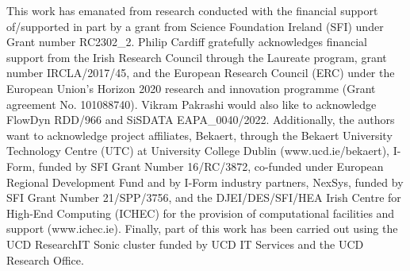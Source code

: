 \documentclass[sn-mathphys,Numbered]{sn-jnl}%
\begin{document}
This work has emanated from research conducted with the financial support of/supported in part by a grant from Science Foundation Ireland (SFI) under Grant number {RC2302\_2}.
Philip Cardiff gratefully acknowledges financial support from the Irish Research Council through the Laureate program, grant number IRCLA/2017/45, and the European Research Council (ERC) under the European Union’s Horizon 2020 research and innovation programme (Grant agreement No. 101088740).
Vikram Pakrashi would also like to acknowledge FlowDyn RDD/966 and SiSDATA EAPA\_0040/2022.
Additionally, the authors want to acknowledge project affiliates, Bekaert, through the Bekaert University Technology Centre (UTC) at University College Dublin (www.ucd.ie/bekaert), I-Form, funded by SFI Grant Number 16/RC/3872, co-funded under European Regional Development Fund and by I-Form industry partners, NexSys, funded by SFI Grant Number 21/SPP/3756, and the DJEI/DES/SFI/HEA Irish Centre for High-End Computing (ICHEC) for the provision of computational facilities and support (www.ichec.ie). Finally, part of this work has been carried out using the UCD ResearchIT Sonic cluster funded by UCD IT Services and the UCD Research Office.



\newpage
\end{document}
